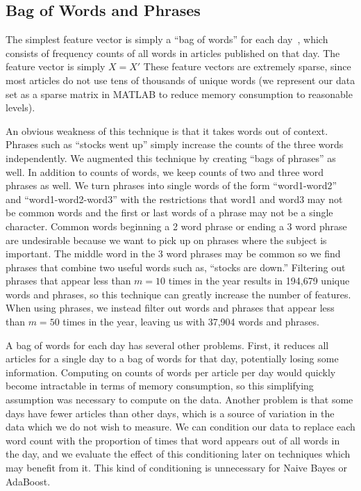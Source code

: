 \documentclass[10pt, twocolumn]{article}
\begin{document}
\subsection{Bag of Words and Phrases}
\label{sec:bagsofwords}

The simplest feature vector is simply a ``bag of words'' for each day~\cite{featurehash}, which consists of frequency counts of all words in articles published on that day. The feature vector is simply $\displaystyle X = X'$ These feature vectors are extremely sparse, since most articles do not use tens of thousands of unique words (we represent our data set as a sparse matrix
in MATLAB to reduce memory consumption to reasonable levels).

An obvious weakness of this technique is that it takes words out of context. Phrases such as ``stocks went up'' simply increase the counts of the three words independently. We augmented this technique by creating ``bags of phrases'' as well. In addition to counts of words, we keep counts of two and three word phrases
as well. We turn phrases into single words of the form ``word1-word2'' and ``word1-word2-word3'' with the restrictions that word1 and word3 may not be common words and the first or last words of a phrase may not be a single character. Common words beginning a 2 word phrase or ending a 3 word phrase are undesirable because we want to pick up on phrases where the subject is important. The middle word in the 3 word phrases may be common so we find phrases that combine two useful words such as, ``stocks are down.'' Filtering out phrases that appear less than $m = 10$ times in the year results in 194,679 unique words and phrases, so this technique can greatly increase the number of features. When using phrases, we instead filter out words and phrases that appear less than $m = 50$ times in the year, leaving us with 37,904 words and phrases.

A bag of words for each day has several other problems. First, it reduces all articles for a single day to a bag of words for that day, potentially losing some information. Computing on counts of words per article per day would quickly become intractable in terms of memory consumption, so this simplifying assumption was necessary to compute on the data. Another problem is that some days have fewer articles than other days, which is a source of variation in the data which we do not wish to measure. We can condition our data to replace each word count with the proportion of times that word appears out of all words in the day, and we evaluate the effect of this conditioning later on techniques which may benefit from it. This kind of conditioning is unnecessary for Naive Bayes or AdaBoost.
\end{document}
